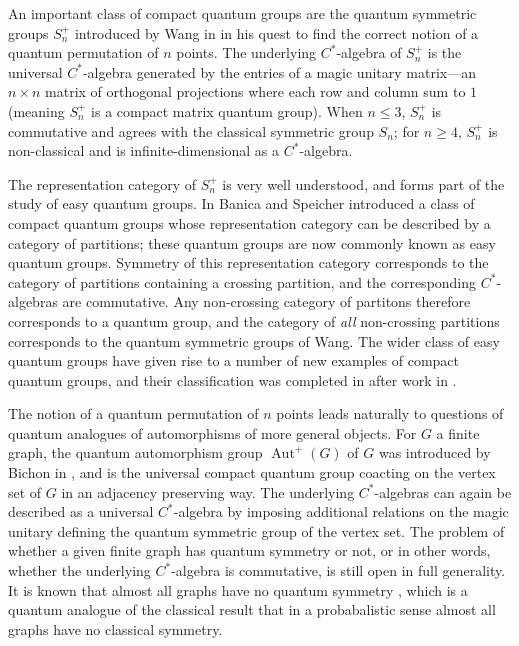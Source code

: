 \documentclass[12pt, a4paper]{amsart}
\def\Aut{\operatorname{Aut}}
\theoremstyle{definition}
\theoremstyle{remark}
\numberwithin{equation}{section}
\begin{document}
An important class of compact quantum groups are the quantum symmetric groups $S_n^+$ introduced by Wang in \cite{Wang1998} in his quest to find the correct notion of a quantum permutation of $n$ points. The underlying $C^*$-algebra of $S_n^+$ is the universal $C^*$-algebra generated by the entries of a magic unitary matrix---an $n \times n$ matrix of orthogonal projections where each row and column sum to $1$ (meaning $S_n^+$ is a compact matrix quantum group). When $n \leq 3$, $S_n^+$ is commutative and agrees with the classical symmetric group $S_n$; for $n \ge 4$, $S_n^+$ is non-classical and is infinite-dimensional as a $C^*$-algebra. 

The representation category of $S_n^+$ is very well understood, and forms part of the study of easy quantum groups. In \cite{BS2009} Banica and Speicher introduced a class of compact quantum groups whose representation category can be described by a category of partitions; these quantum groups are now commonly known as easy quantum groups. Symmetry of this representation category corresponds to the category of partitions containing a crossing partition, and the corresponding $C^*$-algebras are commutative. Any non-crossing category of partitons therefore corresponds to a quantum group, and the category of \textit{all} non-crossing partitions corresponds to the quantum symmetric groups of Wang. The wider class of easy quantum groups have given rise to a number of new examples of compact quantum groups, and their classification was completed in \cite{RW2016} after work in \cite{BS2009,BCP2010,Web2013,RW2014,RW2015}.

The notion of a quantum permutation of $n$ points leads naturally to questions of quantum analogues of automorphisms of more general objects. For $G$ a finite graph, the quantum automorphism group $\Aut^+(G)$ of $G$ was introduced by Bichon in \cite{Bichon03}, and is the universal compact quantum group coacting on the vertex set of $G$ in an adjacency preserving way. The underlying $C^*$-algebras can again be described as a universal $C^*$-algebra by imposing additional relations on the magic unitary defining the quantum symmetric group of the vertex set. The problem of whether a given finite graph has quantum symmetry or not, or in other words, whether the underlying $C^*$-algebra is commutative, is still open in full generality. It is known that almost all graphs have no quantum symmetry \cite{LMR2020}, which is a quantum analogue of the classical result that in a probabalistic sense almost all graphs have no classical symmetry. 
\end{document}
